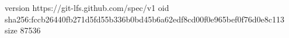 version https://git-lfs.github.com/spec/v1
oid sha256:fccb26440fb271d5fd55b336b0bd45b6a62edf8cd00f0e965bef0f76d0e8c113
size 87536
